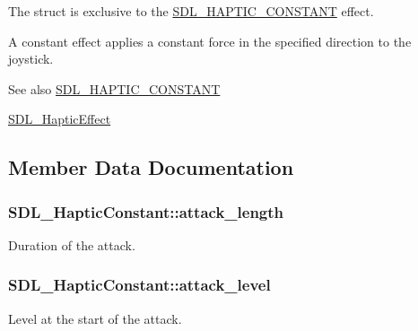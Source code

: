 The struct is exclusive to the \hyperlink{_s_d_l__haptic_8h_a955fb9f680dcf9cc72a3d5263e85b80a}{S\+D\+L\+\_\+\+H\+A\+P\+T\+I\+C\+\_\+\+C\+O\+N\+S\+T\+A\+N\+T} effect.

A constant effect applies a constant force in the specified direction to the joystick.

\begin{DoxySeeAlso}{See also}
\hyperlink{_s_d_l__haptic_8h_a955fb9f680dcf9cc72a3d5263e85b80a}{S\+D\+L\+\_\+\+H\+A\+P\+T\+I\+C\+\_\+\+C\+O\+N\+S\+T\+A\+N\+T} 

\hyperlink{union_s_d_l___haptic_effect}{S\+D\+L\+\_\+\+Haptic\+Effect} 
\end{DoxySeeAlso}


\subsection{Member Data Documentation}
\hypertarget{struct_s_d_l___haptic_constant_a907bade68ab53fb24e7d2651d19b767f}{}
\subsubsection[{attack\+\_\+length}]{ S\+D\+L\+\_\+\+Haptic\+Constant\+::attack\+\_\+length}\label{struct_s_d_l___haptic_constant_a907bade68ab53fb24e7d2651d19b767f}
Duration of the attack. \hypertarget{struct_s_d_l___haptic_constant_a0928a37f3fab0e5b7daffc7a1d65744c}{}
\subsubsection[{attack\+\_\+level}]{ S\+D\+L\+\_\+\+Haptic\+Constant\+::attack\+\_\+level}\label{struct_s_d_l___haptic_constant_a0928a37f3fab0e5b7daffc7a1d65744c}
Level at the start of the attack. \hypertarget{struct_s_d_l___haptic_constant_aa65321f1b002adaab6e629d5bed556e9}{}
